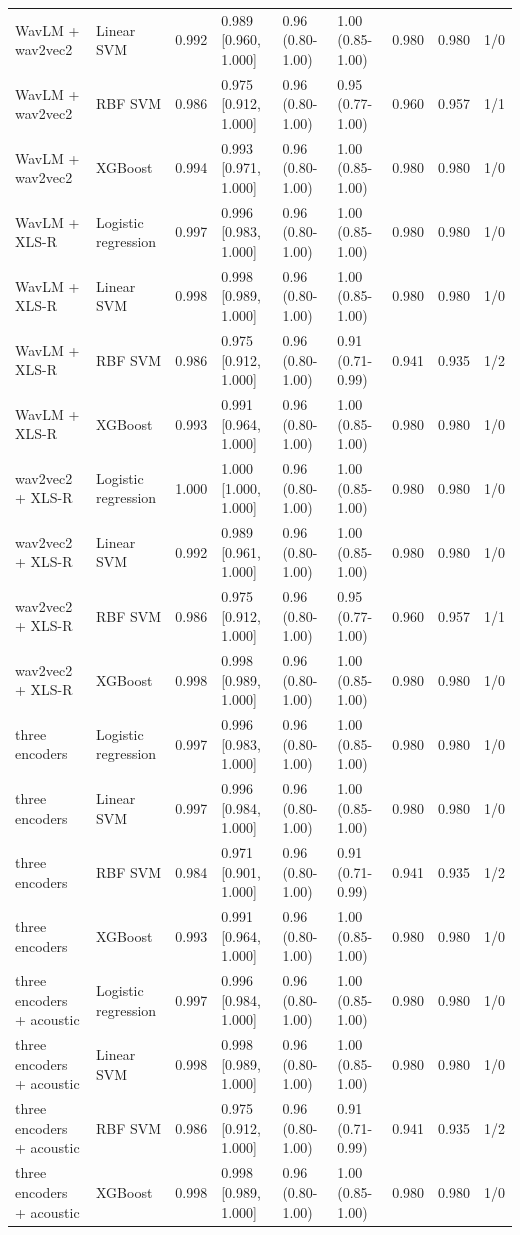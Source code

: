 \documentclass[10pt,a4paper]{article}
\begin{document}
\begin{center}
\begin{longtable}{p{3.0cm}p{2.0cm}rlllrrl}
WavLM + wav2vec2 & Linear SVM & 0.992 & 0.989 [0.960, 1.000] & 0.96 (0.80-1.00) & 1.00 (0.85-1.00) & 0.980 & 0.980 & 1/0\\
WavLM + wav2vec2 & RBF SVM & 0.986 & 0.975 [0.912, 1.000] & 0.96 (0.80-1.00) & 0.95 (0.77-1.00) & 0.960 & 0.957 & 1/1\\
WavLM + wav2vec2 & XGBoost & 0.994 & 0.993 [0.971, 1.000] & 0.96 (0.80-1.00) & 1.00 (0.85-1.00) & 0.980 & 0.980 & 1/0\\
WavLM + XLS-R & Logistic regression & 0.997 & 0.996 [0.983, 1.000] & 0.96 (0.80-1.00) & 1.00 (0.85-1.00) & 0.980 & 0.980 & 1/0\\
WavLM + XLS-R & Linear SVM & 0.998 & 0.998 [0.989, 1.000] & 0.96 (0.80-1.00) & 1.00 (0.85-1.00) & 0.980 & 0.980 & 1/0\\
WavLM + XLS-R & RBF SVM & 0.986 & 0.975 [0.912, 1.000] & 0.96 (0.80-1.00) & 0.91 (0.71-0.99) & 0.941 & 0.935 & 1/2\\
WavLM + XLS-R & XGBoost & 0.993 & 0.991 [0.964, 1.000] & 0.96 (0.80-1.00) & 1.00 (0.85-1.00) & 0.980 & 0.980 & 1/0\\
wav2vec2 + XLS-R & Logistic regression & 1.000 & 1.000 [1.000, 1.000] & 0.96 (0.80-1.00) & 1.00 (0.85-1.00) & 0.980 & 0.980 & 1/0\\
wav2vec2 + XLS-R & Linear SVM & 0.992 & 0.989 [0.961, 1.000] & 0.96 (0.80-1.00) & 1.00 (0.85-1.00) & 0.980 & 0.980 & 1/0\\
wav2vec2 + XLS-R & RBF SVM & 0.986 & 0.975 [0.912, 1.000] & 0.96 (0.80-1.00) & 0.95 (0.77-1.00) & 0.960 & 0.957 & 1/1\\
wav2vec2 + XLS-R & XGBoost & 0.998 & 0.998 [0.989, 1.000] & 0.96 (0.80-1.00) & 1.00 (0.85-1.00) & 0.980 & 0.980 & 1/0\\
three encoders & Logistic regression & 0.997 & 0.996 [0.983, 1.000] & 0.96 (0.80-1.00) & 1.00 (0.85-1.00) & 0.980 & 0.980 & 1/0\\
three encoders & Linear SVM & 0.997 & 0.996 [0.984, 1.000] & 0.96 (0.80-1.00) & 1.00 (0.85-1.00) & 0.980 & 0.980 & 1/0\\
three encoders & RBF SVM & 0.984 & 0.971 [0.901, 1.000] & 0.96 (0.80-1.00) & 0.91 (0.71-0.99) & 0.941 & 0.935 & 1/2\\
three encoders & XGBoost & 0.993 & 0.991 [0.964, 1.000] & 0.96 (0.80-1.00) & 1.00 (0.85-1.00) & 0.980 & 0.980 & 1/0\\
three encoders + acoustic & Logistic regression & 0.997 & 0.996 [0.984, 1.000] & 0.96 (0.80-1.00) & 1.00 (0.85-1.00) & 0.980 & 0.980 & 1/0\\
three encoders + acoustic & Linear SVM & 0.998 & 0.998 [0.989, 1.000] & 0.96 (0.80-1.00) & 1.00 (0.85-1.00) & 0.980 & 0.980 & 1/0\\
three encoders + acoustic & RBF SVM & 0.986 & 0.975 [0.912, 1.000] & 0.96 (0.80-1.00) & 0.91 (0.71-0.99) & 0.941 & 0.935 & 1/2\\
three encoders + acoustic & XGBoost & 0.998 & 0.998 [0.989, 1.000] & 0.96 (0.80-1.00) & 1.00 (0.85-1.00) & 0.980 & 0.980 & 1/0\\
\end{longtable}\end{center}
\end{document}
